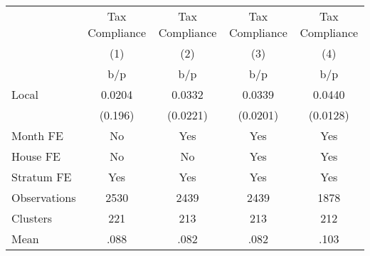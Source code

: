 {
\def\sym#1{\ifmmode^{#1}\else\(^{#1}\)\fi}
\begin{tabular}{l*{4}{c}}
\toprule
                &\multicolumn{1}{c}{Tax Compliance}&\multicolumn{1}{c}{Tax Compliance}&\multicolumn{1}{c}{Tax Compliance}&\multicolumn{1}{c}{Tax Compliance}\\
                &\multicolumn{1}{c}{(1)}&\multicolumn{1}{c}{(2)}&\multicolumn{1}{c}{(3)}&\multicolumn{1}{c}{(4)}\\
                &      b/p&      b/p&      b/p&      b/p\\
\midrule
Local           &   0.0204&   0.0332&   0.0339&   0.0440\\
                &  (0.196)& (0.0221)& (0.0201)& (0.0128)\\
Month FE        &       No&      Yes&      Yes&      Yes\\
House FE        &       No&       No&      Yes&      Yes\\
Stratum FE      &      Yes&      Yes&      Yes&      Yes\\
\midrule
Observations    &     2530&     2439&     2439&     1878\\
Clusters        &      221&      213&      213&      212\\
Mean            &     .088&     .082&     .082&     .103\\
\bottomrule
\end{tabular}
}
